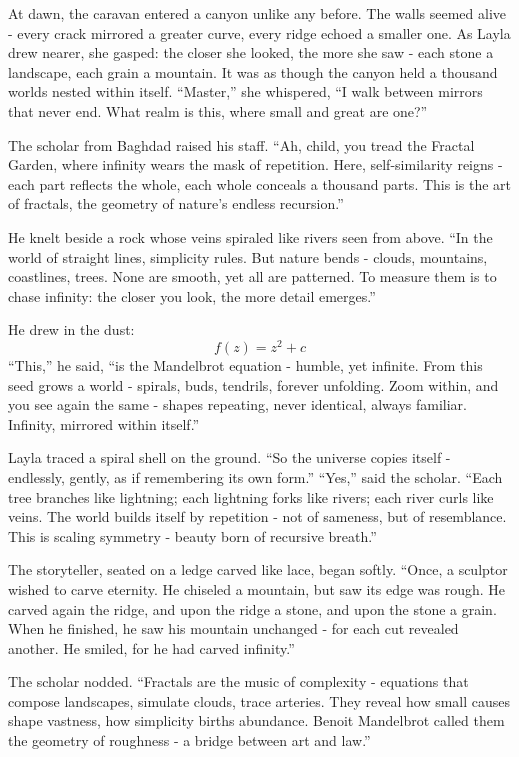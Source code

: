 \documentclass[
  letterpaper,
  DIV=11,
  numbers=noendperiod]{scrreprt}
\begin{document}
At dawn, the caravan entered a canyon unlike any before. The walls
seemed alive - every crack mirrored a greater curve, every ridge echoed
a smaller one. As Layla drew nearer, she gasped: the closer she looked,
the more she saw - each stone a landscape, each grain a mountain. It was
as though the canyon held a thousand worlds nested within itself.
``Master,'' she whispered, ``I walk between mirrors that never end. What
realm is this, where small and great are one?''

The scholar from Baghdad raised his staff. ``Ah, child, you tread the
Fractal Garden, where infinity wears the mask of repetition. Here,
self-similarity reigns - each part reflects the whole, each whole
conceals a thousand parts. This is the art of fractals, the geometry of
nature's endless recursion.''

He knelt beside a rock whose veins spiraled like rivers seen from above.
``In the world of straight lines, simplicity rules. But nature bends -
clouds, mountains, coastlines, trees. None are smooth, yet all are
patterned. To measure them is to chase infinity: the closer you look,
the more detail emerges.''

He drew in the dust: \[
f(z) = z^2 + c
\] ``This,'' he said, ``is the Mandelbrot equation - humble, yet
infinite. From this seed grows a world - spirals, buds, tendrils,
forever unfolding. Zoom within, and you see again the same - shapes
repeating, never identical, always familiar. Infinity, mirrored within
itself.''

Layla traced a spiral shell on the ground. ``So the universe copies
itself - endlessly, gently, as if remembering its own form.'' ``Yes,''
said the scholar. ``Each tree branches like lightning; each lightning
forks like rivers; each river curls like veins. The world builds itself
by repetition - not of sameness, but of resemblance. This is scaling
symmetry - beauty born of recursive breath.''

The storyteller, seated on a ledge carved like lace, began softly.
``Once, a sculptor wished to carve eternity. He chiseled a mountain, but
saw its edge was rough. He carved again the ridge, and upon the ridge a
stone, and upon the stone a grain. When he finished, he saw his mountain
unchanged - for each cut revealed another. He smiled, for he had carved
infinity.''

The scholar nodded. ``Fractals are the music of complexity - equations
that compose landscapes, simulate clouds, trace arteries. They reveal
how small causes shape vastness, how simplicity births abundance. Benoit
Mandelbrot called them the geometry of roughness - a bridge between art
and law.''
\end{document}
